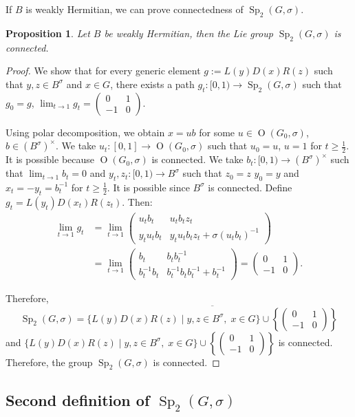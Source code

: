 \documentclass[a4paper,oneside,11pt]{amsart}
\DeclareMathOperator{\Sp}{Sp}
\DeclareMathOperator{\OO}{O}
\newcommand{\Om}{
\begin{pmatrix}
0 & 1\\
-1 & 0
\end{pmatrix}}
\theoremstyle{plain}
\newtheorem{prop}[teo]{Proposition}
\theoremstyle{definition}
\theoremstyle{remark}
\begin{document}
If $B$ is weakly Hermitian, we can prove connectedness of $\Sp_2(G,\sigma)$.

\begin{prop}\label{prop:Sp2Connected}
Let $B$ be weakly Hermitian, then the Lie group $\Sp_2(G,\sigma)$ is connected.
\end{prop}

\begin{proof}
We show that for every generic element $g:=L(y)D(x)R(z)$ such that $y,z\in B^{\sigma}$ and $x\in G$, there exists a path $g_t\colon [0,1)\to \Sp_2(G,\sigma)$ such that $g_0=g$, $\lim_{t\to 1} g_t=\Om$.

Using polar decomposition, we obtain $x=ub$ for some $u\in \OO(G_0,\sigma)$, $b\in (B^{\sigma})^\times$. We take $u_t\colon [0,1]\to \OO(G_0,\sigma)$ such that $u_0=u$, $u=1$ for $t\geq\frac{1}{2}$. It is possible because $\OO(G_0,\sigma)$ is connected. We take $b_t\colon [0,1)\to (B^{\sigma})^\times$ such that $\lim_{t\to 1}b_t=0$ and $y_t,z_t\colon [0,1)\to B^{\sigma}$ such that $z_0=z$ $y_0=y$ and $x_t=-y_t=b_t^{-1}$ for $t\geq \frac{1}{2}$. It is possible since $B^{\sigma}$ is connected. Define $g_t=L(y_t)D(x_t)R(z_t)$. Then:
\begin{align*}
\lim_{t\to 1}g_t & =\lim_{t\to 1}
\begin{pmatrix}
u_tb_t & u_tb_tz_t\\
y_tu_tb_t & y_tu_tb_tz_t+\sigma(u_tb_t)^{-1}
\end{pmatrix}\\
& =\lim_{t\to 1}
\begin{pmatrix}
b_t & b_tb_t^{-1}\\
b_t^{-1}b_t & b_t^{-1}b_tb_t^{-1}+b_t^{-1}
\end{pmatrix}=\Om.    
\end{align*}

\noindent Therefore,
$$\Sp_2(G,\sigma)=\overline{\{L(y)D(x)R(z)\mid y,z\in B^{\sigma},\;x\in G\}\cup\left\{\Om\right\}}$$
and $\{L(y)D(x)R(z)\mid y,z\in B^{\sigma},\;x\in G\}\cup \left\{\Om\right\}$ is connected. Therefore, the group $\Sp_2(G,\sigma)$ is connected.
\end{proof}


\subsection{Second definition of \texorpdfstring{$\Sp_2(G,\sigma)$}{Sp2(G,sigma)}}
\end{document}
